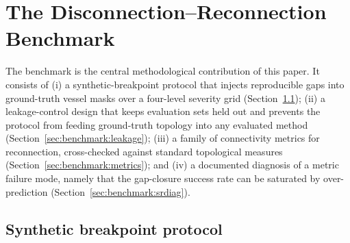 \section{The Disconnection--Reconnection Benchmark}
\label{sec:benchmark}

The benchmark is the central methodological contribution of this paper. It
consists of (i) a synthetic-breakpoint protocol that injects reproducible
gaps into ground-truth vessel masks over a four-level severity grid
(Section~\ref{sec:benchmark:protocol}); (ii) a leakage-control design that
keeps evaluation sets held out and prevents the protocol from feeding
ground-truth topology into any evaluated method
(Section~\ref{sec:benchmark:leakage}); (iii) a family of connectivity
metrics for reconnection, cross-checked against standard topological measures
(Section~\ref{sec:benchmark:metrics}); and (iv) a documented diagnosis of a
metric failure mode, namely that the gap-closure success rate can be
saturated by over-prediction (Section~\ref{sec:benchmark:srdiag}).

\subsection{Synthetic breakpoint protocol}
\label{sec:benchmark:protocol}


